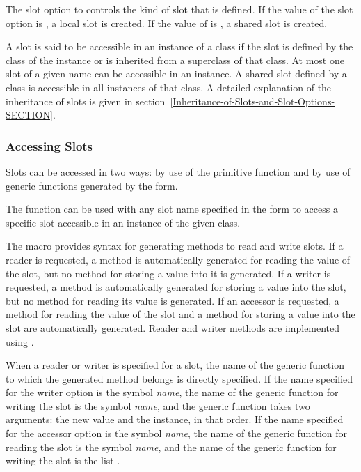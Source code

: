 The  slot option to  controls the kind
of slot that is defined.  If the value of the  slot
option is , a local slot is created.  If the value of
 is , a shared slot is created.

A slot is said to be {\bit accessible\/} in an instance of a class if
the slot is defined by the class of the instance or is inherited from
a superclass of that class.  At most one slot of a given name can be
accessible in an instance.  A shared slot defined by a class is
accessible in all instances of that class.  A detailed explanation of
the inheritance of slots is given in
section~\ref{Inheritance-of-Slots-and-Slot-Options-SECTION}.

\subsubsection{Accessing Slots}

Slots can be accessed in two ways: by use of the primitive function
 and by use of generic functions generated by the 
 form.

The function  can be used with any slot name
specified in the  form to access a specific slot
accessible in an instance of the given class.

The macro  provides syntax for generating methods to
read and write slots.  If a {\bit reader\/} is requested, a method is
automatically generated for reading the value of the slot, but no
method for storing a value into it is generated.  If a {\bit writer\/}
is requested, a method is automatically generated for storing a value
into the slot, but no method for reading its value is generated.  If
an {\bit accessor\/} is requested, a method for reading the value of
the slot and a method for storing a value into the slot are
automatically generated.  Reader and writer methods are implemented
using .

When a reader or writer is specified for a slot, the name of the
generic function to which the generated method belongs is directly
specified.  If the name specified for the writer option is the symbol
{\it name}, the name of the generic function for writing the slot
is the symbol {\it name}, and the generic function takes two
arguments: the new value and the instance, in that order.  If the name
specified for the accessor option is the symbol {\it name}, the
name of the generic function for reading the slot is the symbol {\it
name\/}, and the name of the generic function for writing the slot is
the list .

